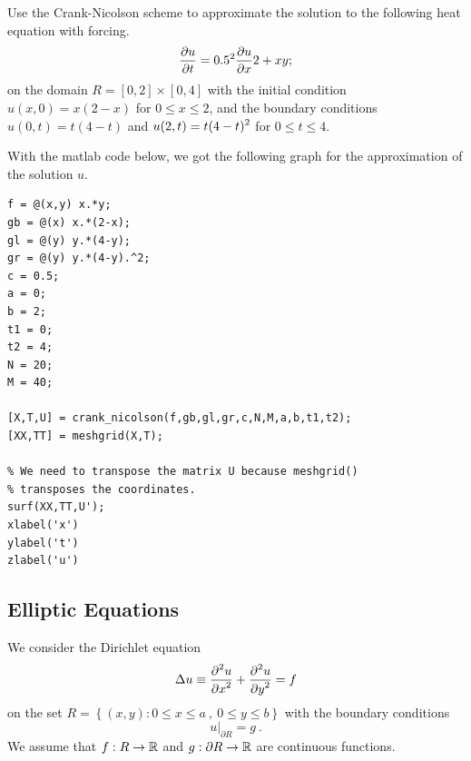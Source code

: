 \begin{egg}
Use the Crank-Nicolson scheme to approximate the solution to
the following heat equation with forcing.
\[
\frac{\partial{u}}{\partial{t}} = 0.5^2 \frac{\partial{u}}{\partial{x}}{2} + xy;
\]
on the domain $R=[0,2] \times [0,4]$ with the initial condition
$u(x,0) = x(2-x)$ for $0 \leq x \leq 2$, and the boundary conditions
$u(0,t) = t(4-t)$ and $\displaystyle u(2,t) = t(4-t)^2$ for $0 \leq t \leq 4$.

With the matlab code below, we got the following graph for the
approximation of the solution $u$.

\begin{code}
\small
\begin{verbatim}
f = @(x,y) x.*y;
gb = @(x) x.*(2-x);
gl = @(y) y.*(4-y);
gr = @(y) y.*(4-y).^2;
c = 0.5;
a = 0;
b = 2;
t1 = 0;
t2 = 4;
N = 20;
M = 40;

[X,T,U] = crank_nicolson(f,gb,gl,gr,c,N,M,a,b,t1,t2);
[XX,TT] = meshgrid(X,T);

% We need to transpose the matrix U because meshgrid()
% transposes the coordinates.
surf(XX,TT,U');
xlabel('x')
ylabel('t')
zlabel('u')
\end{verbatim}
\end{code}
\end{egg}

\subsection{Elliptic Equations} \label{DirEquSection}

We consider the Dirichlet equation
\begin{equation} \label{DirEqu}
\Delta u \equiv \frac{\displaystyle \partial^{2}{u}} {\displaystyle \partial{x}^{2}} + \frac{\displaystyle \partial^{2}{u}} {\displaystyle \partial{y}^{2}} = f
\end{equation}
on the set $R = \left\{ (x,y) : 0 \leq x \leq a \ , \ 0 \leq y \leq b \right\}$
with the boundary conditions
\[
u\big|_{\partial R} = g \ .
\]
We assume that $f:R \rightarrow \mathbb{R}$ and $g:\partial R \rightarrow \mathbb{R}$
are continuous functions.

